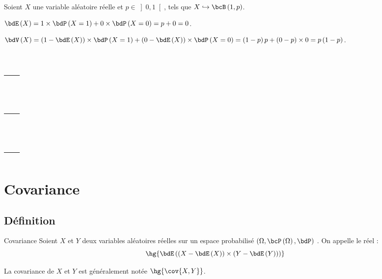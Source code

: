 \documentclass[a4paper,french,bookmarks]{article}
\begin{document}
    \begin{nproof}
        Soient $X$ une variable aléatoire réelle et $p \in \left]0, 1\right[$, tels que $X \hookrightarrow \bcB\left(1, p\right)$.
        
        \begin{enumerate}
            \itt $\bdE\left(X\right) = 1\times\bdP\left(X = 1\right) + 0\times\bdP\left(X = 0\right) = p + 0 = 0$.
            
            \itt $\bdV\left(X\right) = \left(1 - \bdE\left(X\right)\right)\times\bdP\left(X = 1\right) + \left(0 - \bdE\left(X\right)\right)\times\bdP\left(X = 0\right) = \left(1 - p\right)p + \left(0 - p\right)\times 0 = p\left(1 - p\right)$.
        \end{enumerate}
    \end{nproof}
    
\section{---}

\section{---}

\section{---}

\newpage

\section{Covariance}

\subsection{Définition}

\begin{definition}{Covariance}{}
    Soient $X$ et $Y$ deux variables aléatoires réelles sur un espace probabilisé $\left(\Omega, \bcP\left(\Omega\right), \bdP \right)$ . On appelle  le réel :
    \[ \hg{\bdE\left(\left(X - \bdE\left(X\right)\right)\times\left(Y - \bdE\left(Y\right)\right)\right)}\]
\end{definition}
%
\begin{notation}
    La covariance de $X$ et $Y$ est généralement notée $\hg{\cov{X, Y}}$.
\end{notation}
\end{document}
